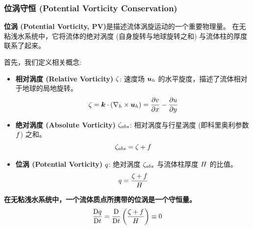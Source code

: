 \subsubsection{位涡守恒 (Potential Vorticity Conservation)}

\textbf{位涡 (Potential Vorticity, PV)}是描述流体涡旋运动的一个重要物理量。
在无粘浅水系统中，它将流体的绝对涡度 (自身旋转与地球旋转之和) 与流体柱的厚度联系了起来。

首先，我们定义相关概念:
\begin{itemize}
    \item \textbf{相对涡度 (Relative Vorticity)} $\zeta$:
    速度场 $\bm{u}_h$ 的水平旋度，描述了流体相对于地球的局地旋转。
    \begin{equation}
        \relvort = \kvec \cdot (\nabla_h \times \vel_h) = \pde{v}{x} - \pde{u}{y}
        \label{eq:def_relative_vorticity}
    \end{equation}

    \item \textbf{绝对涡度 (Absolute Vorticity)} $\zeta_{abs}$:
    相对涡度与行星涡度 (即科里奥利参数 $f$) 之和。
    \begin{equation}
        \zeta_{abs} = \zeta + f
        \label{eq:def_absolute_vorticity}
    \end{equation}

    \item \textbf{位涡 (Potential Vorticity)} $q$:
    绝对涡度 $\zeta_{abs}$ 与流体柱厚度 $H$ 的比值。
    \begin{equation}
        q = \frac{\zeta + f}{H}
        \label{eq:def_potential_vorticity}
    \end{equation}
\end{itemize}

\textbf{在无粘浅水系统中，一个流体质点所携带的位涡是一个守恒量。}
\begin{equation}
    \frac{\mathrm{D} q}{\mathrm{D} t} = \frac{\mathrm{D} }{\mathrm{D} t}\left(\frac{\zeta + f}{H}\right) \equiv 0
    \label{eq:pv_conservation}
\end{equation}

